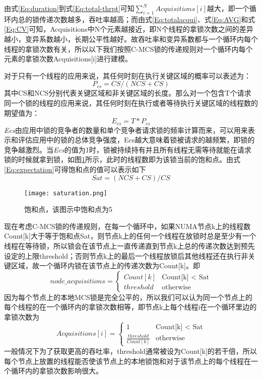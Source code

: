 由式\ref{Eq:duration}到式\ref{Eq:total-thrpt}可知$\sum_{i=1}^{N} Acquisitions[i]$越大，即一个循环内总的锁传递次数越多，吞吐率越高；而由式\ref{Eq:totalacqui}、式\ref{Eq:AVG}和式\ref{Eq:CV}可知，Acquisitions中N个元素越接近，即N个线程的拿锁次数之间的差异越小，变异系数越小，长期公平性越好。故吞吐率和变异系数都与一个循环内每个线程的拿锁次数有关，所以以下我们按照C-MCS锁的传递规则对一个循环内每个元素的拿锁次数Acquisitions[i]进行建模。

对于只有一个线程的应用来说，其任何时刻在执行关键区域的概率可以表述为：
\begin{equation}\label{Eq:pro}
     P_{cs} = CS / (NCS + CS)
\end{equation}
其中CS和NCS分别代表关键区域和非关键区域的长度。那么对一个包含T个请求同一个锁的线程的应用来说，其任何时刻在执行或者等待执行关键区域的线程数的期望值为：
\begin{equation}\label{Eq:expectation}
     E_{cs} = T * P_{cs}
\end{equation}
\emph{Ecs}由应用中锁的竞争者的数量和单个竞争者请求锁的频率计算而来，可以用来表示和评估应用中的锁的总体竞争强度，Ecs越大意味着锁被请求的越频繁，即锁的竞争越激烈。当\emph{Ecs}的值为1时，锁被持续持有并且所有线程无需等待就能在请求锁的时候就拿到锁，如图\ref{Fig:saturation}所示，此时的线程数即为该锁当前的饱和点\cite{dice2017malthusian}。由式\ref{Eq:expectation}可得饱和点的值可以表示如下
\begin{equation}\label{Eq:sat}
     Sat = (NCS + CS) / CS
\end{equation}

\begin{figure}[t]
	\centering
	\texttt{[image: saturation.png]}
	\caption{饱和点，该图示中饱和点为5}
	\label{Fig:saturation}
\end{figure}

现在考虑C-MCS锁的传递规则，在每一个循环中，如果NUMA节点k上的线程数Count[k]大于等于饱和点Sat，则节点k上的任何一个线程在放锁时总是至少有一个线程在等待锁，所以锁会在该节点上一直传递直到节点k上总的传递次数达到预先设定的上限threshold；否则节点k上的最后一个线程放锁后其他线程还在执行非关键区域，故一个循环内锁在该节点上的传递次数为Count[k]。即
\begin{equation}\label{Eq:localtrans}
node\_acquisitions =
\begin{cases}
Count[k] &\text{Count[k] < Sat}\\
threshold &\text{otherwise}
\end{cases}
\end{equation}
因为每个节点上的本地MCS锁是完全公平的，所以我们可以认为同一个节点上的每个线程的在一个循环内的拿锁次数相等，即节点k上每个线程i在一个循环里边的拿锁次数为
\begin{equation}\label{Eq:per}
Acquisitions[i] =
\begin{cases}
1 &\text{Count[k] < Sat}\\
\frac{threshold}{Count[k]} &\text{otherwise}
\end{cases}
\end{equation}
一般情况下为了获取更高的吞吐率，threshold通常被设为Count[k]的若干倍，所以每个节点上放置的线程能否使该节点上的本地锁饱和对于该节点上的每个线程在一个循环内的拿锁次数影响很大。

